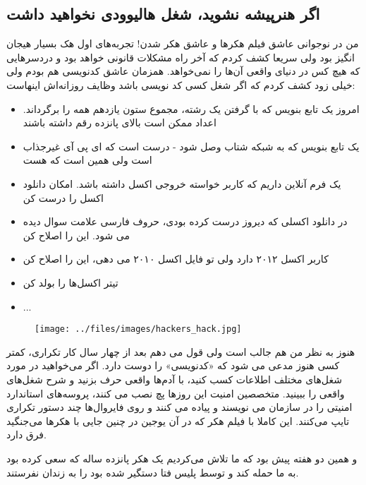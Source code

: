 \subsection*{اگر هنرپیشه نشوید، شغل هالیوودی نخواهید داشت}
من در نوجوانی عاشق فیلم هکرها
	 و عاشق هکر شدن! تجربه‌های اول هک بسیار هیجان انگیز بود ولی سریعا کشف کردم که آخر راه مشکلات قانونی خواهد بود و دردسرهایی که هیچ کس در دنیای واقعی آن‌ها را نمی‌خواهد. همزمان عاشق کدنویسی هم بودم ولی خیلی زود کشف کردم که اگر شغل کسی کد نویسی باشد وظایف روزانه‌اش اینهاست:
\begin{itemize}
\item امروز یک تابع بنویس که با گرفتن یک رشته، مجموع ستون یازدهم همه را برگرداند. اعداد ممکن است بالای پانزده رقم داشته باشند
\item یک تابع بنویس که به شبکه شتاب وصل شود - درست است که ای پی آی غیرجذاب است ولی همین است که هست
\item یک فرم آنلاین داریم که کاربر خواسته خروجی اکسل داشته باشد. امکان دانلود اکسل را درست کن
\item در دانلود اکسلی که دیروز درست کرده بودی، حروف فارسی علامت سوال دیده می شود. این را اصلاح کن
\item کاربر اکسل ۲۰۱۲ دارد ولی تو فایل اکسل ۲۰۱۰ می دهی، این را اصلاح کن
\item تیتر اکسل‌ها را بولد کن
\item ...
\end{itemize}

\begin{figure}[H]
	\begin{center}
		\texttt{[image: ../files/images/hackers\_hack.jpg]}
	\end{center}
\end{figure}
هنوز به نظر من هم جالب است ولی قول می دهم بعد از چهار سال کار تکراری، کمتر کسی هنوز مدعی می شود که «کدنویسی» را دوست دارد. اگر می‌خواهید در مورد شغل‌های مختلف اطلاعات کسب کنید، با آدم‌ها واقعی حرف بزنید و شرح شغل‌های واقعی را ببینید. متخصصین امنیت این روزها پچ نصب می کنند، پروسه‌های استاندارد امنیتی را در سازمان می نویسند و پیاده می کنند و روی فایروال‌ها چند دستور تکراری تایپ می‌کنند. این کاملا با فیلم هکر که در آن یوجین در چنین جایی با هکرها می‌جنگید فرق دارد.

و همین دو هفته پیش بود که ما تلاش می‌کردیم یک هکر پانزده ساله که سعی کرده بود به ما حمله کند و توسط پلیس فتا دستگیر شده بود را به زندان نفرستند.

